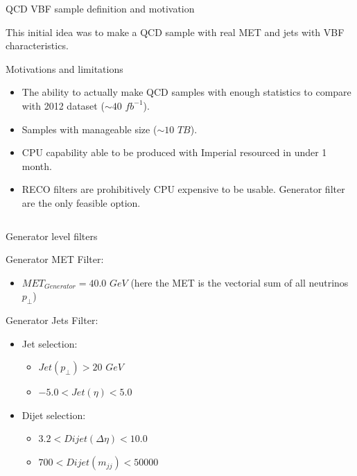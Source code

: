 \documentclass[8pt]{beamer}
\begin{document}
\begin{frame}{QCD VBF sample definition and motivation}

This initial idea was to make a QCD sample with real MET and jets with VBF characteristics.

\begin{block}{Motivations and limitations}
  
\begin{itemize}
  \item The ability to actually make QCD samples with enough statistics to compare with 2012 dataset ($\sim40$ $fb^{-1}$).
  \item Samples with manageable size ($\sim10$ $TB$).
  \item CPU capability able to be produced with Imperial resourced in under 1 month.
  \item RECO filters are prohibitively CPU expensive to be usable. Generator filter are the only feasible option.
\end{itemize}

\end{block}

\vspace{-10px}
\begin{columns}

\begin{block}{Generator level filters}

\tiny

Generator MET Filter:
\begin{itemize}
  \item $MET_{Generator} = 40.0$ $GeV$ (here the MET is the vectorial sum of all neutrinos $p_{\perp}$)
\end{itemize}

Generator Jets Filter:
\begin{itemize}
  \item Jet selection: 
  \begin{itemize}
    \item \tiny $Jet(p_{\perp})>20$ $GeV$
    \item \tiny $-5.0<Jet(\eta)<5.0$
  \end{itemize}
  \item Dijet selection:
  \begin{itemize}
    \item \tiny $3.2<Dijet(\Delta\eta)<10.0$
    \item \tiny $700<Dijet(m_{jj})<50000$
  \end{itemize}
\end{itemize}


\end{block}
\end{columns}
\end{frame}
\end{document}

